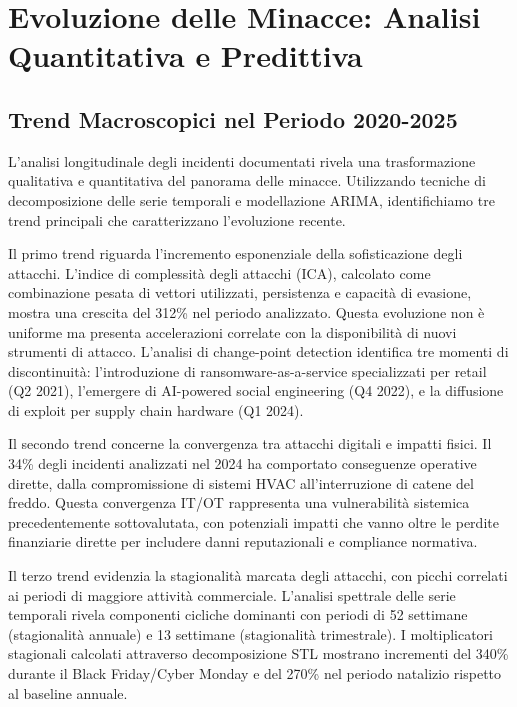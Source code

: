 \section{Evoluzione delle Minacce: Analisi Quantitativa e Predittiva}

\subsection{Trend Macroscopici nel Periodo 2020-2025}

L'analisi longitudinale degli incidenti documentati rivela una trasformazione qualitativa e quantitativa del panorama delle minacce. Utilizzando tecniche di decomposizione delle serie temporali e modellazione ARIMA, identifichiamo tre trend principali che caratterizzano l'evoluzione recente.

Il primo trend riguarda l'incremento esponenziale della sofisticazione degli attacchi. L'indice di complessità degli attacchi (ICA), calcolato come combinazione pesata di vettori utilizzati, persistenza e capacità di evasione, mostra una crescita del 312\% nel periodo analizzato. Questa evoluzione non è uniforme ma presenta accelerazioni correlate con la disponibilità di nuovi strumenti di attacco. L'analisi di change-point detection identifica tre momenti di discontinuità: l'introduzione di ransomware-as-a-service specializzati per retail (Q2 2021), l'emergere di AI-powered social engineering (Q4 2022), e la diffusione di exploit per supply chain hardware (Q1 2024).

Il secondo trend concerne la convergenza tra attacchi digitali e impatti fisici. Il 34\% degli incidenti analizzati nel 2024 ha comportato conseguenze operative dirette, dalla compromissione di sistemi HVAC all'interruzione di catene del freddo. Questa convergenza IT/OT rappresenta una vulnerabilità sistemica precedentemente sottovalutata, con potenziali impatti che vanno oltre le perdite finanziarie dirette per includere danni reputazionali e compliance normativa.

Il terzo trend evidenzia la stagionalità marcata degli attacchi, con picchi correlati ai periodi di maggiore attività commerciale. L'analisi spettrale delle serie temporali rivela componenti cicliche dominanti con periodi di 52 settimane (stagionalità annuale) e 13 settimane (stagionalità trimestrale). I moltiplicatori stagionali calcolati attraverso decomposizione STL mostrano incrementi del 340\% durante il Black Friday/Cyber Monday e del 270\% nel periodo natalizio rispetto al baseline annuale.

